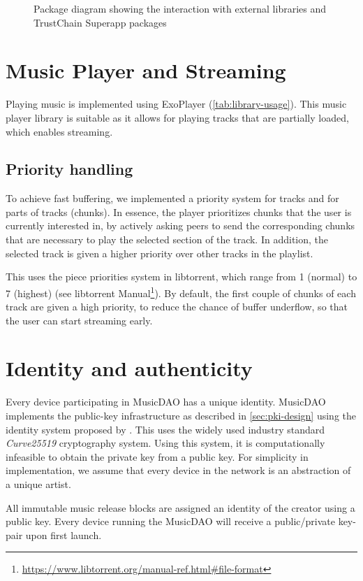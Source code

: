 \begin{figure}
        \caption{Package diagram showing the interaction with external libraries and TrustChain Superapp packages}
    \label{fig:package-diagram}
    \endminipage
\end{figure}

\section{Music Player and Streaming} 
Playing music is implemented using ExoPlayer (\ref{tab:library-usage}). This music player library is suitable as it allows for playing tracks that are partially loaded, which enables streaming.
\subsection{Priority handling}
To achieve fast buffering, we implemented a priority system for tracks and for parts of tracks (chunks). In essence, the player prioritizes chunks that the user is currently interested in, by actively asking peers to send the corresponding chunks that are necessary to play the selected section of the track. In addition, the selected track is given a higher priority over other tracks in the playlist.

This uses the piece priorities system in libtorrent, which range from 1 (normal) to 7 (highest) (see libtorrent Manual\footnote{\url{https://www.libtorrent.org/manual-ref.html\#file-format}}). By default, the first couple of chunks of each track are given a high priority, to reduce the chance of buffer underflow, so that the user can start streaming early.

\section{Identity and authenticity}
\label{sec:identity-authenticity}
Every device participating in MusicDAO has a unique identity. MusicDAO implements the public-key infrastructure as described in \ref{sec:pki-design} using the identity system proposed by \cite{mattskala2020}. This uses the widely used industry standard \textit{Curve25519} cryptography system. Using this system, it is computationally infeasible to obtain the private key from a  public key. For simplicity in implementation, we assume that every device in the network is an abstraction of a unique artist. 

All immutable music release blocks are assigned an identity of the creator using a public key. Every device running the MusicDAO will receive a public/private key-pair upon first launch. 

